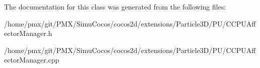 The documentation for this class was generated from the following files\+:\begin{DoxyCompactItemize}
\item 
/home/pmx/git/\+P\+M\+X/\+Simu\+Cocos/cocos2d/extensions/\+Particle3\+D/\+P\+U/C\+C\+P\+U\+Affector\+Manager.\+h\item 
/home/pmx/git/\+P\+M\+X/\+Simu\+Cocos/cocos2d/extensions/\+Particle3\+D/\+P\+U/C\+C\+P\+U\+Affector\+Manager.\+cpp\end{DoxyCompactItemize}
